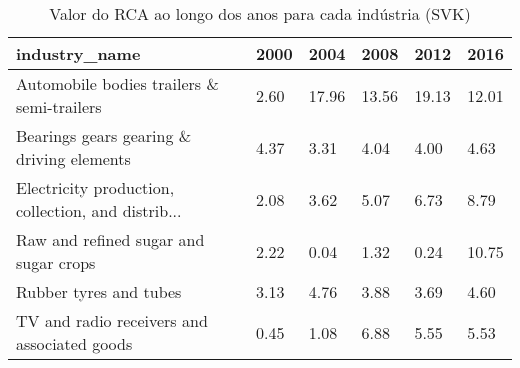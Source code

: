 \begin{table}
\centering
\caption{Valor do RCA ao longo dos anos para cada indústria (SVK)}
\begin{tabular}{p{6cm}p{1.5cm}p{1.5cm}p{1.5cm}p{1.5cm}p{1.5cm}}
\toprule
                                     industry\_name & 2000 &  2004 &  2008 &  2012 &  2016 \\
\midrule
        Automobile bodies trailers \& semi-trailers & 2.60 & 17.96 & 13.56 & 19.13 & 12.01 \\
         Bearings gears gearing \& driving elements & 4.37 &  3.31 &  4.04 &  4.00 &  4.63 \\
Electricity production, collection, and distrib... & 2.08 &  3.62 &  5.07 &  6.73 &  8.79 \\
             Raw and refined sugar and sugar crops & 2.22 &  0.04 &  1.32 &  0.24 & 10.75 \\
                            Rubber tyres and tubes & 3.13 &  4.76 &  3.88 &  3.69 &  4.60 \\
       TV and radio receivers and associated goods & 0.45 &  1.08 &  6.88 &  5.55 &  5.53 \\
\bottomrule
\end{tabular}
\end{table}
